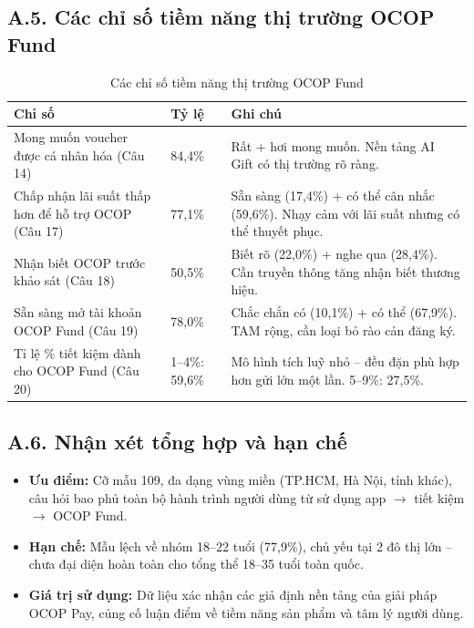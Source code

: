 \documentclass[13pt,a4paper]{extarticle}
\begin{document}
\subsection*{A.5. Các chỉ số tiềm năng thị trường OCOP Fund}

\begin{table}[H]
\centering
\caption{Các chỉ số tiềm năng thị trường OCOP Fund}
\begin{tabular}{|p{5cm}|p{2cm}|p{6cm}|}
\hline
\textbf{Chỉ số} & \textbf{Tỷ lệ} & \textbf{Ghi chú} \\
\hline
Mong muốn voucher được cá nhân hóa (Câu 14) & 84,4\% & Rất + hơi mong muốn. Nền tảng AI Gift có thị trường rõ ràng. \\
\hline
Chấp nhận lãi suất thấp hơn để hỗ trợ OCOP (Câu 17) & 77,1\% & Sẵn sàng (17,4\%) + có thể cân nhắc (59,6\%). Nhạy cảm với lãi suất nhưng có thể thuyết phục. \\
\hline
Nhận biết OCOP trước khảo sát (Câu 18) & 50,5\% & Biết rõ (22,0\%) + nghe qua (28,4\%). Cần truyền thông tăng nhận biết thương hiệu. \\
\hline
Sẵn sàng mở tài khoản OCOP Fund (Câu 19) & 78,0\% & Chắc chắn có (10,1\%) + có thể (67,9\%). TAM rộng, cần loại bỏ rào cản đăng ký. \\
\hline
Tỉ lệ \% tiết kiệm dành cho OCOP Fund (Câu 20) & 1--4\%: 59,6\% & Mô hình tích luỹ nhỏ -- đều đặn phù hợp hơn gửi lớn một lần. 5--9\%: 27,5\%. \\
\hline
\end{tabular}
\end{table}

\subsection*{A.6. Nhận xét tổng hợp và hạn chế}

\begin{itemize}
    \item \textbf{Ưu điểm:} Cỡ mẫu 109, đa dạng vùng miền (TP.HCM, Hà Nội, tỉnh khác), câu hỏi bao phủ toàn bộ hành trình người dùng từ sử dụng app $\rightarrow$ tiết kiệm $\rightarrow$ OCOP Fund.
    \item \textbf{Hạn chế:} Mẫu lệch về nhóm 18--22 tuổi (77,9\%), chủ yếu tại 2 đô thị lớn -- chưa đại diện hoàn toàn cho tổng thể 18--35 tuổi toàn quốc.
    \item \textbf{Giá trị sử dụng:} Dữ liệu xác nhận các giả định nền tảng của giải pháp OCOP Pay, củng cố luận điểm về tiềm năng sản phẩm và tâm lý người dùng.
\end{itemize}
\end{document}
